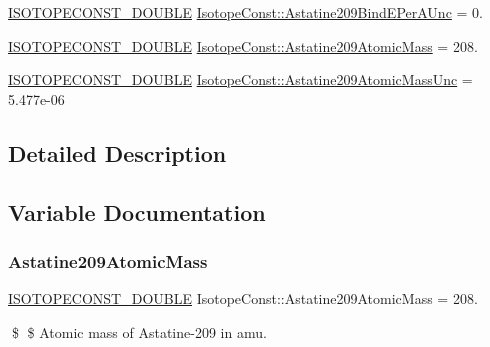 \begin{DoxyCompactItemize}
\mbox{\hyperlink{group___isotope_const-_macros_ga8f45a7272ce02c0b4c65c44636ed719a}{I\+S\+O\+T\+O\+P\+E\+C\+O\+N\+S\+T\+\_\+\+D\+O\+U\+B\+LE}} \mbox{\hyperlink{group___isotope_const-_astatine-_at209_ga2c815dd4c2432db913c6da274baa5c3c}{Isotope\+Const\+::\+Astatine209\+Bind\+E\+Per\+A\+Unc}} = 0.
\item 
\mbox{\hyperlink{group___isotope_const-_macros_ga8f45a7272ce02c0b4c65c44636ed719a}{I\+S\+O\+T\+O\+P\+E\+C\+O\+N\+S\+T\+\_\+\+D\+O\+U\+B\+LE}} \mbox{\hyperlink{group___isotope_const-_astatine-_at209_gaf6c1edd53359b7c3c4d417409b07bcf7}{Isotope\+Const\+::\+Astatine209\+Atomic\+Mass}} = 208.
\item 
\mbox{\hyperlink{group___isotope_const-_macros_ga8f45a7272ce02c0b4c65c44636ed719a}{I\+S\+O\+T\+O\+P\+E\+C\+O\+N\+S\+T\+\_\+\+D\+O\+U\+B\+LE}} \mbox{\hyperlink{group___isotope_const-_astatine-_at209_ga51836a440c7dceed2492d3e62eee3bf8}{Isotope\+Const\+::\+Astatine209\+Atomic\+Mass\+Unc}} = 5.\+477e-\/06
\end{DoxyCompactItemize}


\subsection{Detailed Description}


\subsection{Variable Documentation}
\mbox{\label{group___isotope_const-_astatine-_at209_gaf6c1edd53359b7c3c4d417409b07bcf7}} 
\subsubsection{\texorpdfstring{Astatine209\+Atomic\+Mass}{Astatine209AtomicMass}}
{\footnotesize\ttfamily \mbox{\hyperlink{group___isotope_const-_macros_ga8f45a7272ce02c0b4c65c44636ed719a}{I\+S\+O\+T\+O\+P\+E\+C\+O\+N\+S\+T\+\_\+\+D\+O\+U\+B\+LE}} Isotope\+Const\+::\+Astatine209\+Atomic\+Mass = 208.}

\$ \$ Atomic mass of Astatine-\/209 in amu. \mbox{\label{group___isotope_const-_astatine-_at209_ga51836a440c7dceed2492d3e62eee3bf8}} 
